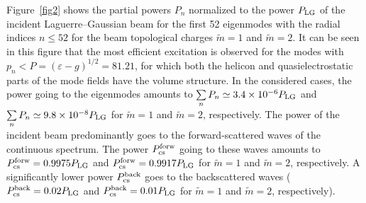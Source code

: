 \documentclass[conference,a4paper]{IEEEtran}
\begin{document}
Figure~\ref{fig2} shows the partial powers $P_n$ normalized to the power $P_{\rm LG}$ of the incident Laguerre--Gaussian beam for the first 52 eigenmodes with the radial indices $n\leq 52$ for the beam topological charges $\tilde{m}=1$ and $\tilde{m}=2$. It can be seen in this figure that the most efficient excitation is observed for the modes with $ p_n<P=(\varepsilon-g)^{1/2}=81{.}21$, for which both the helicon and quasielectrostatic parts of the mode fields have the volume structure. In the considered cases, the power going to the eigenmodes amounts to $\sum\limits_{n}P_n\simeq3.4\times 10^{-6} P_{\rm LG}$ and $\sum\limits_{n}P_n\simeq9.8\times 10^{-8} P_{\rm LG}$ for $\tilde{m}=1$ and $\tilde{m}=2$, respectively. The power of the incident beam predominantly goes to the forward-scattered waves of the continuous spectrum. The power $P_{\rm cs}^{\rm forw}$ going to these waves amounts to $P_{\rm cs}^{\rm forw} = 0{.}9975 P_{\rm LG}$ and $P_{\rm cs}^{\rm forw} = 0{.}9917 P_{\rm LG}$ for $\tilde{m}=1$ and $\tilde{m}=2$, respectively. A significantly lower power $P_{\rm cs}^{\rm back}$ goes to the backscattered waves ($P_{\rm cs}^{\rm back} = 0{.}02 P_{\rm LG}$ and $P_{\rm cs}^{\rm back} = 0{.}01 P_{\rm LG}$ for $\tilde{m}=1$ and $\tilde{m}=2$, respectively).




\end{document}

